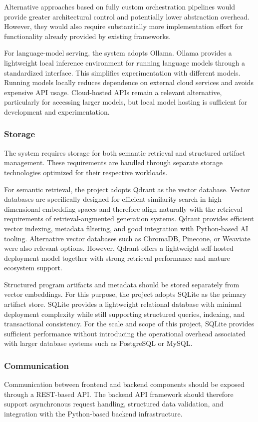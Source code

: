 Alternative approaches based on fully custom orchestration pipelines would provide greater architectural control and potentially lower abstraction overhead. However, they would also require substantially more implementation effort for functionality already provided by existing frameworks.

For language-model serving, the system adopts Ollama. Ollama provides a lightweight local inference environment for running language models through a standardized interface. This simplifies experimentation with different models. Running models locally reduces dependence on external cloud services and avoids expensive API usage. Cloud-hosted APIs remain a relevant alternative, particularly for accessing larger models, but local model hosting is sufficient for development and experimentation.

\subsubsection{Storage}
The system requires storage for both semantic retrieval and structured artifact management. These requirements are handled through separate storage technologies optimized for their respective workloads.

For semantic retrieval, the project adopts Qdrant as the vector database. Vector databases are specifically designed for efficient similarity search in high-dimensional embedding spaces and therefore align naturally with the retrieval requirements of retrieval-augmented generation systems. Qdrant provides efficient vector indexing, metadata filtering, and good integration with Python-based AI tooling. Alternative vector databases such as ChromaDB, Pinecone, or Weaviate were also relevant options. However, Qdrant offers a lightweight self-hosted deployment model together with strong retrieval performance and mature ecosystem support.

Structured program artifacts and metadata should be stored separately from vector embeddings. For this purpose, the project adopts SQLite as the primary artifact store. SQLite provides a lightweight relational database with minimal deployment complexity while still supporting structured queries, indexing, and transactional consistency. For the scale and scope of this project, SQLite provides sufficient performance without introducing the operational overhead associated with larger database systems such as PostgreSQL or MySQL.

\subsubsection{Communication}
Communication between frontend and backend components should be exposed through a REST-based API. The backend API framework should therefore support asynchronous request handling, structured data validation, and integration with the Python-based backend infrastructure.


